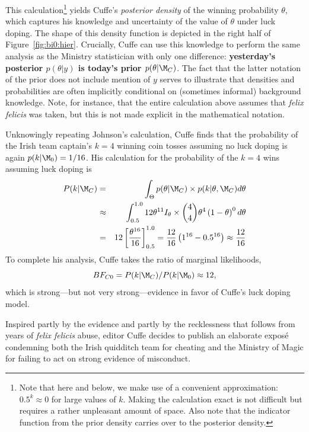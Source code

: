 This calculation\footnote{Note that here and below, we make use of a convenient approximation: $0.5^k \approx 0$ for large values of $k$.  Making the calculation exact is not difficult but requires a rather unpleasant amount of space. Also note that the indicator function from the prior density carries over to the posterior density.} yields Cuffe's \emph{posterior density} of the winning probability $\theta$, which captures his knowledge and uncertainty of the value of $\theta$ under luck doping. {The shape of this density function is depicted in the right half of Figure~\ref{fig:bi0:hier}.}  Crucially, Cuffe can use this knowledge to perform the same analysis as the Ministry statistician with only one difference: \textbf{yesterday's posterior $p(\theta|y)$ is today's prior $p(\theta|\M_C)$}. The fact that the latter notation of the prior does not include mention of $y$ serves to illustrate that densities and probabilities are often implicitly conditional on (sometimes informal) background knowledge.  Note, for instance, that the entire calculation above assumes that \emph{felix felicis} was taken, but this is not made explicit in the mathematical notation.

Unknowingly repeating Johnson's calculation, Cuffe finds that the probability of the Irish team captain's $k=4$ winning coin tosses assuming no luck doping is again $p(k|\M_0) = 1/16$.  His calculation for the probability of the $k=4$ wins assuming luck doping is
\begin{eqnarray*}
P(k|\M_C) &=& \int_{\Theta} p(\theta|\M_C)\times p(k|\theta,\M_C) d \theta
\\
&\approx& \int_{0.5}^{1.0} 12\theta^{11}I_\theta \times \binom{4}{4} \theta^4 \left(1-\theta\right)^0 d \theta \\
 &=& 12 \left[\frac{\theta^{16}}{16} \right]_{0.5}^{1.0}
 = \frac{12}{16} \left(1^{16} - 0.5^{16} \right)
 \approx \frac{12}{16}
\end{eqnarray*}
To complete his analysis, Cuffe takes the ratio of marginal likelihoods, $$BF_{C0}=P(k|\M_C)/P(k|\M_0) \approx 12,$$ which is strong---but not very strong---evidence in favor of Cuffe's luck doping model.  

Inspired partly by the evidence and partly by the recklessness that follows from years of \emph{felix felicis} abuse, editor Cuffe decides to publish an elaborate expos\'e condemning both the Irish quidditch team for cheating and the Ministry of Magic for failing to act on strong evidence of misconduct.

